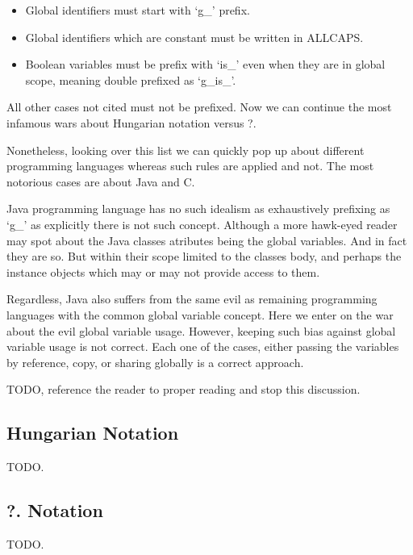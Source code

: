 \begin{englishtext}
    \begin{itemize}

    \item Global identifiers must start with `g\_' prefix.

    \item Global identifiers which are constant must be written in ALLCAPS.

    \item Boolean variables must be prefix with `is\_' even when they are in
    global scope, meaning double prefixed as `g\_is\_'.

    \end{itemize}

    All other cases not cited must not be prefixed. Now we can continue the most
    infamous wars about Hungarian notation versus ?.

    Nonetheless, looking over this list we can quickly pop up about different
    programming languages whereas such rules are applied and not. The most
    notorious cases are about Java and C.

    Java programming language has no such idealism as exhaustively prefixing as
    `g\_' as explicitly there is not such concept. Although a more hawk-eyed
    reader may spot about the Java classes atributes being the global variables.
    And in fact they are so. But within their scope limited to the classes body,
    and perhaps the instance objects which may or may not provide access to
    them.

    Regardless, Java also suffers from the same evil as remaining programming
    languages with the common global variable concept. Here we enter on the
    war about the evil global variable usage. However, keeping such bias against
    global variable usage is not correct. Each one of the cases, either passing
    the variables by reference, copy, or sharing globally is a correct approach.

    TODO, reference the reader to proper reading and stop this discussion.


    \subsection{Hungarian Notation}

    TODO.


    \subsection{?. Notation}

    TODO.

\end{englishtext}




